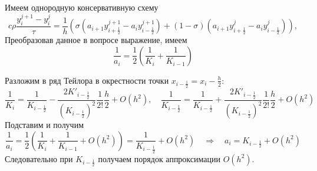 \documentclass[12pt, a4paper]{article}
\begin{document}
	
	\begin{comment}
		Имем однородную консервативную схему 
		\begin{equation*}
			c \rho \frac{y^{j+1}_i - y^{j}_i}{\tau} = \frac{1}{h} (\sigma(a_{i+1} y^{j+1}_{i+\frac{1}{2}} - a_{i} y^{j+1}_{i-\frac{1}{2}}) + (1-\sigma)(a_{i+1} y^{j}_{i+\frac{1}{2}} - a_{i} y^{j}_{i-\frac{1}{2}})),
		\end{equation*}
		где $a_i = \displaystyle{(\frac{1}{h}\int_{x_{i-1}}^{x_i} \frac{dx}{K(x)})^{-1}}$.
		
		 
		Пусть $a_i = \frac{2 K(x_i) K(x_{i-1})}{K(x_i) + K(x_{i-1})}$. Тогда из равенства $\frac{2 K(x_i) K(x_{i-1})}{K(x_i) + K(x_{i-1})} = \displaystyle{(\frac{1}{h}\int_{x_{i-1}}^{x_i} \frac{dx}{K(x)})^{-1}}$ получим, что
		\begin{equation*}
			\int_{x_{i-1}}^{x_i} \frac{dx}{K(x)} = h \frac{2 K(x_i) K(x_{i-1})}{K(x_i) + K(x_{i-1})} = \frac{h}{2} (\frac{1}{K(x_{i-1})} + \frac{1}{K(x_{i})}).
		\end{equation*}
		Можно увидеть, что выражение является формулой трапеций, которая, как известно, имеет второй порядок точности. Следовательно рассмотренный случай также имеет 2 порядок.
	\end{comment}
	
	Имеем однородную консервативную схему 
	\begin{equation*}
		c \rho \frac{y^{j+1}_i - y^{j}_i}{\tau} = \frac{1}{h} (\sigma(a_{i+1} y^{j+1}_{i+\frac{1}{2}} - a_{i} y^{j+1}_{i-\frac{1}{2}}) + (1-\sigma)(a_{i+1} y^{j}_{i+\frac{1}{2}} - a_{i} y^{j}_{i-\frac{1}{2}})),
	\end{equation*}
	Преобразовав данное в вопросе выражение, имеем
	\begin{equation*}
		\frac{1}{a_i} = \frac{1}{2} \left( \frac{1}{K_i} + \frac{1}{K_{i-1}} \right)
	\end{equation*}
	
	
	Разложим в ряд Тейлора в окрестности точки $x_{i-\frac{1}{2}} = x_i - \frac{h}{2}$:
	\begin{equation*}
		\frac{1}{K_i} = \frac{1}{K_{i-\frac{1}{2}}} - \frac{2 K'_{i-\frac{1}{2}}}{(K_{i-\frac{1}{2}})^2} \frac{1}{2!} \frac{h}{2} + O(h^2), \quad
		\frac{1}{K_{i-\frac{1}{2}}} = \frac{1}{K_{i-\frac{1}{2}}} + \frac{2 K'_{i-\frac{1}{2}}}{(K_{i-\frac{1}{2}})^2} \frac{1}{2!} \frac{h}{2} + O(h^2)
	\end{equation*}
	Подставим и получим
	\begin{equation*}
	\frac{1}{a_i} = \frac{1}{2} \left( \frac{1}{K_i} + \frac{1}{K_{i-1} } + O(h^2)\right) = \frac{1}{K_{i-\frac{1}{2}}} + O(h^2)  \quad \Rightarrow \quad a_i = K_{i-\frac{1}{2}} + O(h^2)
	\end{equation*}
	Следовательно при $K_{i-\frac{1}{2}}$ получаем порядок аппроксимации $O(h^2)$.
	
\end{document}
